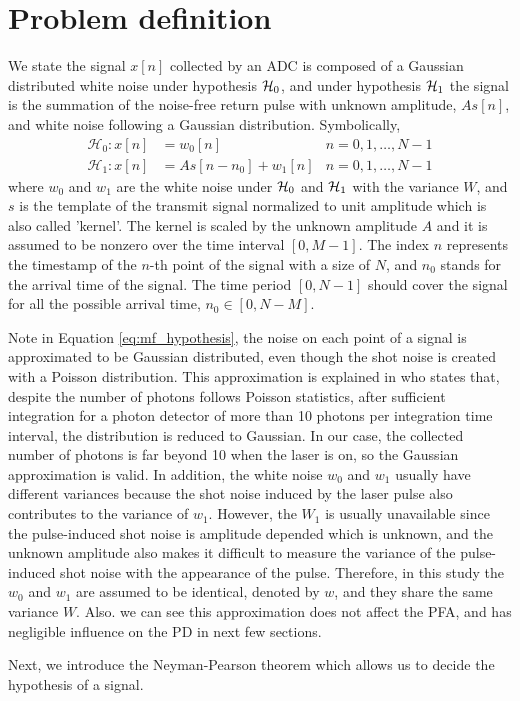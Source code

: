 \section{Problem definition}
We state the signal $x[n]$ collected by an ADC is composed of a Gaussian distributed white noise under hypothesis $\operatorname*{\mathcal{H}_0}$, and under hypothesis $\operatorname*{\mathcal{H}_1}$ the signal is the summation of the noise-free return pulse with unknown amplitude, $As[n]$, and white noise following a  Gaussian distribution. Symbolically,
\begin{align}\label{eq:mf_hypothesis}
\mathcal{H}_0:x[n]&=w_0[n]  &n=0, 1,\ldots, N-1\\
\mathcal{H}_1:x[n]&=As[n-n_0]+w_1[n]  &n=0, 1,\ldots, N-1    
\end{align}
where $w_0$ and $w_1$ are the white noise under $\operatorname*{\mathcal{H}_0}$ and $\operatorname*{\mathcal{H}_1}$ with the variance $W$, and $s$ is the template of the transmit signal normalized to unit amplitude which is also called 'kernel'. The kernel is scaled by the unknown amplitude $A$ and it is assumed to be nonzero over the time interval $[0,M-1]$. The index $n$ represents the timestamp of the $n$-th point of the signal with a size of $N$, and $n_0$ stands for the arrival time of the signal. The time period $[0, N-1]$ should cover the signal for all the possible arrival time, \ie $n_0\in[0, N-M]$. \par
Note in Equation \eqref{eq:mf_hypothesis}, the noise on each point of a signal is approximated to be Gaussian distributed, even though the shot noise is created with a Poisson distribution. This approximation is explained in \citep{wall1979practical} who states that, despite the number of photons follows Poisson statistics, after sufficient integration for a photon detector of more than 10 photons per integration time interval, the distribution is reduced to Gaussian. In our case, the collected number of photons is far beyond 10 when the laser is on, so the Gaussian approximation is valid. In addition, the white noise $w_0$ and $w_1$ usually have different variances because the shot noise induced by the laser pulse also contributes to the variance of $w_1$. However, the $W_1$ is usually unavailable since the pulse-induced shot noise is amplitude depended which is unknown, and the unknown amplitude also makes it difficult to measure the variance of the pulse-induced shot noise with the appearance of the pulse. Therefore, in this study the $w_0$ and $w_1$ are assumed to be identical, denoted by $w$, and they share the same variance $W$. Also. we can see this approximation does not affect the PFA, and has negligible influence on the PD in next few sections. \par
Next, we introduce the Neyman-Pearson theorem which allows us to decide the hypothesis of a signal.
